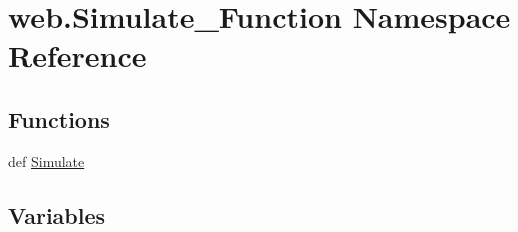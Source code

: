 \hypertarget{namespaceweb_1_1_simulate___function}{\section{web.\-Simulate\-\_\-\-Function Namespace Reference}
\label{namespaceweb_1_1_simulate___function}
}
\subsection*{Functions}
\begin{DoxyCompactItemize}
\item 
def \hyperlink{namespaceweb_1_1_simulate___function_a96d5cc0f6da7b87529b9ce38e0ad20d4}{Simulate}
\end{DoxyCompactItemize}
\subsection*{Variables}
